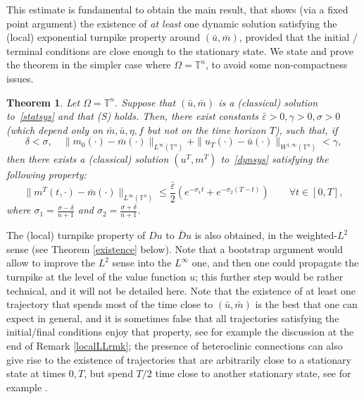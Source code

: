 \documentclass[10pt,a4paper,nouppercase,nowrite]{article}
\numberwithin{equation}{section}
\newcommand{\Sp}{{\textsc (S)} }
\newcommand{\eps}{\varepsilon}
\newcommand{\T}{\mathbb{T}}
\newtheorem{thm}[defn]{Theorem}
\theoremstyle{definition}
\begin{document}
	
	This estimate is fundamental to obtain the main result, that shows (via a fixed point argument) the existence of \textit{at least} one dynamic solution satisfying the (local) exponential turnpike property around $(\bar u,\bar m)$, provided that the initial / terminal conditions are close enough to the stationary state. We state and prove the theorem in the simpler case where $\Omega = \T^n$, to avoid some non-compactness issues.
		\begin{thm} \label{existenceintro}
	Let $\Omega=\T^n$. Suppose that $(\bar u, \bar m)$ is a (classical) solution to~\eqref{statsys} and that \Sp holds. Then, there exist constants $\bar{\eps} > 0, \gamma > 0, \sigma > 0$ (which depend only on $\bar m, \bar u, \eta, f$ but not on the time horizon $T$), such that, if
	\begin{equation*}
		\delta < \sigma, \quad \| m_0(\cdot)-\bar m(\cdot) \|_{L^{\infty}(\T^n)} + \| u_T(\cdot) - \bar u(\cdot)\|_{W^{1,\infty}(\T^n)} < \gamma,
	\end{equation*}
	then there exists a (classical) solution $(u^T,m^T)$ to~\eqref{dynsys} satisfying the following property:
		\begin{equation*}
		\|m^T(t,\cdot)-\bar m(\cdot)\|_{L^{\infty}(\T^n)} \le \frac{\bar{\eps}}{2} \left( e^{-\sigma_1 t} + e^{-\sigma_2(T-t)} \right) \qquad \forall t \in [0,T],
	\end{equation*}
	where $\sigma_1=\frac{\sigma-\delta}{n+1}$ and $\sigma_2=\frac{\sigma+\delta}{n+1}$.
\end{thm}
	
	The (local) turnpike property of $Du$ to $\bar Du$ is also obtained, in the weighted-$L^2$ sense (see Theorem \ref{existence} below). Note that a bootstrap argument would allow to improve the $L^2$ sense into the $L^\infty$ one, and then one could propagate the turnpike at the level of the value function $u$; this further step would be rather technical, and it will not be detailed here. Note that the existence of at least one trajectory that spends most of the time close to $(\bar u, \bar m)$ is the best that one can expect in general, and it is sometimes false that all trajectories satisfying the initial/final conditions enjoy that property, see for example the discussion at the end of Remark \ref{localLLrmk}; the presence of heteroclinic connections can also give rise to the existence of trajectories that are arbitrarily close to a stationary state at times $0,T$, but spend $T/2$ time close to another stationary state, see for example \cite{CC21}.
	
\end{document}

